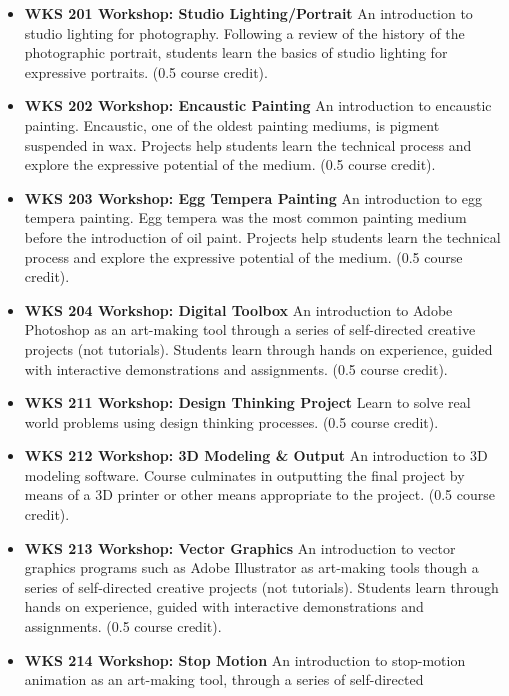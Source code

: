 \documentclass[
  letterpaper,
]{scrbook}
\providecommand{\tightlist}{%
  \setlength{\itemsep}{0pt}\setlength{\parskip}{0pt}}
\begin{document}
\begin{itemize}
\tightlist
\item
  \textbf{WKS 201 Workshop: Studio Lighting/Portrait} An introduction to
  studio lighting for photography. Following a review of the history of
  the photographic portrait, students learn the basics of studio
  lighting for expressive portraits. (0.5 course credit).\\
\item
  \textbf{WKS 202 Workshop: Encaustic Painting} An introduction to
  encaustic painting. Encaustic, one of the oldest painting mediums, is
  pigment suspended in wax. Projects help students learn the technical
  process and explore the expressive potential of the medium. (0.5
  course credit).
\item
  \textbf{WKS 203 Workshop: Egg Tempera Painting} An introduction to egg
  tempera painting. Egg tempera was the most common painting medium
  before the introduction of oil paint. Projects help students learn the
  technical process and explore the expressive potential of the medium.
  (0.5 course credit).\\
\item
  \textbf{WKS 204 Workshop: Digital Toolbox} An introduction to Adobe
  Photoshop as an art-making tool through a series of self-directed
  creative projects (not tutorials). Students learn through hands on
  experience, guided with interactive demonstrations and assignments.
  (0.5 course credit).
\item
  \textbf{WKS 211 Workshop: Design Thinking Project} Learn to solve real
  world problems using design thinking processes. (0.5 course credit).\\
\item
  \textbf{WKS 212 Workshop: 3D Modeling \& Output} An introduction to 3D
  modeling software. Course culminates in outputting the final project
  by means of a 3D printer or other means appropriate to the project.
  (0.5 course credit).
\item
  \textbf{WKS 213 Workshop: Vector Graphics} An introduction to vector
  graphics programs such as Adobe Illustrator as art-making tools though
  a series of self-directed creative projects (not tutorials). Students
  learn through hands on experience, guided with interactive
  demonstrations and assignments. (0.5 course credit).\\
\item
  \textbf{WKS 214 Workshop: Stop Motion} An introduction to stop-motion
  animation as an art-making tool, through a series of self-directed

\end{itemize}
\end{document}
